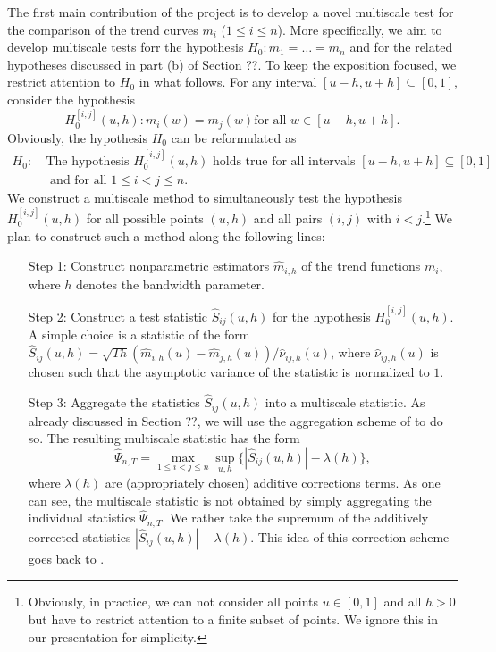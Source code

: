 \documentclass[a4paper,12pt]{article}
\begin{document}
\begin{itemize}[label=--,leftmargin=0.5cm]
\noindent The first main contribution of the project is to develop a novel multiscale test for the comparison of the trend curves $m_i$ ($1 \le i \le n$). More specifically, we aim to develop multiscale tests forr the hypothesis $H_0: m_1 = \ldots = m_n$ and for the related hypotheses discussed in part (b) of Section ??. To keep the exposition focused, we restrict attention to $H_0$ in what follows. For any interval $[u-h,u+h] \subseteq [0,1]$, consider the hypothesis
\[ H_0^{[i,j]}(u,h): m_i(w) = m_j(w) \text{for all } w \in [u-h,u+h]. \] 
Obviously, the hypothesis $H_0$ can be reformulated as
\begin{align*}
H_0: \ & \text{The hypothesis } H_0^{[i,j]}(u,h) \text{ holds true for all intervals } [u-h,u+h] \subseteq [0,1] \\ & \text{ and for all } 1 \le i < j \le n. 
\end{align*} 
We construct a multiscale method to simultaneously test the hypothesis $H_0^{[i,j]}(u,h)$ for all possible points $(u,h)$ and all pairs $(i,j)$ with $i < j$.\footnote{Obviously, in practice, we can not consider all points $u \in [0,1]$ and all $h > 0$ but have to restrict attention to a finite subset of points. We ignore this in our presentation for simplicity.} We plan to construct such a method along the following lines: 
\begin{itemize}[leftmargin=1.5cm]
\item[Step 1:] Construct nonparametric estimators $\hat{m}_{i,h}$ of the trend functions $m_i$, where $h$ denotes the bandwidth parameter.   
\item[Step 2:] Construct a test statistic $\hat{S}_{ij}(u,h)$ for the hypothesis $H_0^{[i,j]}(u,h)$. A simple choice is a statistic of the form $\hat{S}_{ij}(u,h) = \sqrt{Th} (\hat{m}_{i,h}(u) - \hat{m}_{j,h}(u)) / \hat{\nu}_{ij,h}(u)$, where $\hat{\nu}_{ij,h}(u)$ is chosen such that the asymptotic variance of the statistic is normalized to $1$. 
\item[Step 3:] Aggregate the statistics $\hat{S}_{ij}(u,h)$ into a multiscale statistic. As already discussed in Section ??, we will use the aggregation scheme of \cite{DuembgenSpokoiny2001} to do so. The resulting multiscale statistic has the form 
\[ \hat{\Psi}_{n,T} = \max_{1 \le i < j \le n} \sup_{u,h} \big\{ |\hat{S}_{ij}(u,h)| - \lambda(h) \big\},  \]
where $\lambda(h)$ are (appropriately chosen) additive corrections terms. As one can see, the multiscale statistic is not obtained by simply aggregating the individual statistics $\hat{\Psi}_{n,T}$. We rather take the supremum of the additively corrected statistics $|\hat{S}_{ij}(u,h)| - \lambda(h)$. This idea of this correction scheme goes back to \cite{DuembgenSpokoiny2001}. 

\end{itemize}
\end{itemize}
\end{document}
